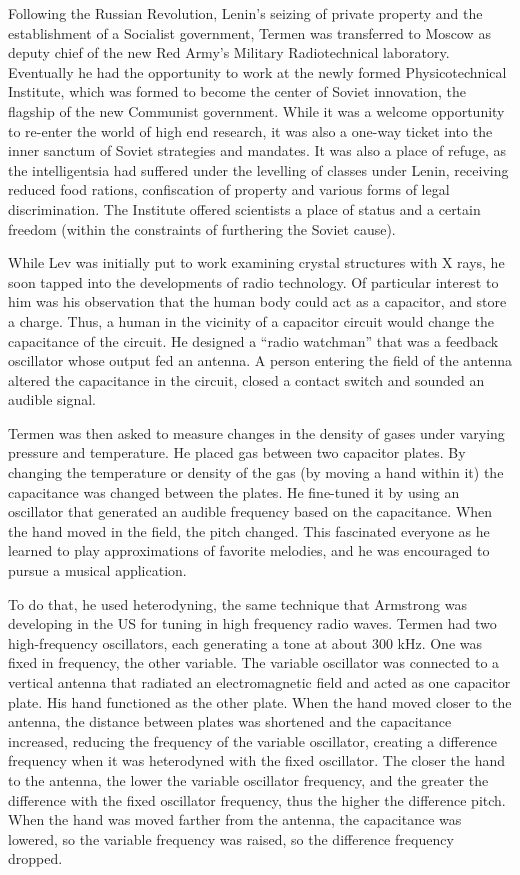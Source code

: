 Following the Russian Revolution, Lenin's seizing of private property and the establishment of a Socialist government, Termen was transferred to Moscow as deputy chief of the new Red Army's Military Radiotechnical laboratory. Eventually he had the opportunity to work at the newly formed Physicotechnical Institute, which was formed to become the center of Soviet innovation, the flagship of the new Communist government. While it was a welcome opportunity to re-enter the world of high end research, it was also a one-way ticket into the inner sanctum of Soviet strategies and mandates. It was also a place of refuge, as the intelligentsia had suffered under the levelling of classes under Lenin, receiving reduced food rations, confiscation of property and various forms of legal discrimination. The Institute offered scientists a place of status and a certain freedom (within the constraints of furthering the Soviet cause).

While Lev was initially put to work examining crystal structures with X rays, he soon tapped into the developments of radio technology. Of particular interest to him was his observation that the human body could act as a capacitor, and store a charge. Thus, a human in the vicinity of a capacitor circuit would change the capacitance of the circuit. He designed a ``radio watchman'' that was a feedback oscillator whose output fed an antenna. A person entering the field of the antenna altered the capacitance in the circuit, closed a contact switch and sounded an audible signal.

Termen was then asked to measure changes in the density of gases under varying pressure and temperature. He placed gas between two capacitor plates. By changing the temperature or density of the gas (by moving a hand within it) the capacitance was changed between the plates. He fine-tuned it by using an oscillator that generated an audible frequency based on the capacitance. When the hand moved in the field, the pitch changed. This fascinated everyone as he learned to play approximations of favorite melodies, and he was encouraged to pursue a musical application.

To do that, he used heterodyning, the same technique that Armstrong was developing in the US for tuning in high frequency radio waves. Termen had two high-frequency oscillators, each generating a tone at about 300 kHz. One was fixed in frequency, the other variable. The variable oscillator was connected to a vertical antenna that radiated an electromagnetic field and acted as one capacitor plate. His hand functioned as the other plate. When the hand moved closer to the antenna, the distance between plates was shortened and the capacitance increased, reducing the frequency of the variable oscillator, creating a difference frequency when it was heterodyned with the fixed oscillator. The closer the hand to the antenna, the lower the variable oscillator frequency, and the greater the difference with the fixed oscillator frequency, thus the higher the difference pitch. When the hand was moved farther from the antenna, the capacitance was lowered, so the variable frequency was raised, so the difference frequency dropped.

